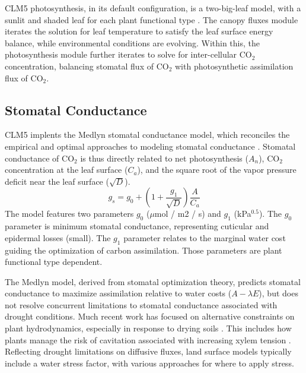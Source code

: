 \documentclass[draft,linenumbers]{agujournal}
\begin{document}
    CLM5 photosynthesis, in its default configuration, is a two-big-leaf model, with a sunlit and shaded leaf for each plant functional type \citep{thornton2007, dai2004, oleson2013}. 
    The canopy fluxes module iterates the solution for leaf temperature to satisfy the leaf surface energy balance, while environmental conditions are evolving.
    Within this, the photosynthesis module further iterates to solve for inter-cellular CO$_2$ concentration, balancing stomatal flux of 
    CO$_2$ with photosynthetic assimilation flux of CO$_2$.
    

\subsection{Stomatal Conductance}
\label{sect:gs}
    CLM5 implents the Medlyn stomatal conductance model, which reconciles the empirical and optimal approaches to modeling 
    stomatal conductance \citep{medlyn2011}. 
    Stomatal conductance of CO$_2$ is thus directly related to net photosynthesis ($A_n$), CO$_2$ concentration at the leaf surface 
    ($C_a$), and the square root of the vapor pressure deficit near the leaf surface ($\sqrt{D}$).
    \begin{equation}
    g_s=g_0+\left(1+\dfrac{g_1}{\sqrt{D}}\right)\dfrac{A}{C_a}
    \end{equation}
    The model features two parameters $g_0$ ($\mu$mol / m2 / s) and $g_1$ (kPa$^{0.5}$). 
    The $g_0$ parameter is minimum stomatal conductance, representing cuticular and epidermal losses (small). 
    The $g_1$ parameter relates to the marginal water cost guiding the optimization of carbon assimilation.
    Those parameters are plant functional type dependent.
    
    The Medlyn model, derived from stomatal optimization theory, predicts stomatal conductance to maximize assimilation relative to water costs ($A-\lambda E$), 
    but does not resolve concurrent limitations to stomatal conductance associated with drought conditions.
    Much recent work has focused on alternative constraints on plant hydrodynamics, especially in response to drying soils \citep{manzoni2013b,novick2016a,zhou2014}.
    This includes how plants manage the risk of cavitation associated with increasing xylem tension \citep{sperry1998}.
    Reflecting drought limitations on diffusive fluxes, land surface models typically include a water stress factor, with various approaches for where to apply stress.
    
\end{document}
